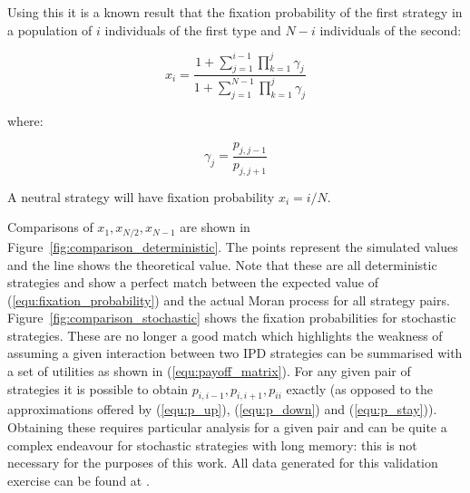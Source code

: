 \documentclass{article}
\begin{document}
Using this it is a known result \cite{Nowak2017} that the fixation probability
of the first strategy in a population of \(i\) individuals of the first type
and \(N-i\) individuals of the second:

\begin{equation}\label{equ:fixation_probability}
x_i = \frac{1 + \sum_{j=1}^{i-1}\prod_{k=1}^{j}\gamma_j}{1 + \sum_{j=1}^{N-1}
      \prod_{k=1}^{j}\gamma_j}
\end{equation}

where:

\[
\gamma_j = \frac{p_{j, j-1}}{p_{j, j+1}}
\]

A neutral strategy will have fixation probability $x_i = i/N$.

Comparisons of \(x_1, x_{N/2}, x_{N-1}\) are shown in
Figure~\ref{fig:comparison_deterministic}. The points represent the simulated
values and the line shows the theoretical value. Note that these are all
deterministic strategies and show a perfect match between the expected value
of (\ref{equ:fixation_probability}) and the actual Moran process for all
strategy pairs. Figure~\ref{fig:comparison_stochastic} shows the fixation probabilities for
stochastic strategies. These are no longer a good match which highlights the
weakness of assuming a given interaction between two IPD strategies can be
summarised with a set of utilities as shown in
(\ref{equ:payoff_matrix}). For any given pair of strategies it is possible to
obtain \(p_{i,i-1}, p_{i,i+1}, p_{ii}\) exactly (as opposed to the
approximations offered by (\ref{equ:p_up}), (\ref{equ:p_down}) and
(\ref{equ:p_stay})). Obtaining these requires particular analysis for a given
pair and can be quite a complex endeavour for stochastic strategies with long
memory: this is not necessary for the purposes of this work.
All data generated for this validation exercise can be found
at \cite{data}.
\end{document}
